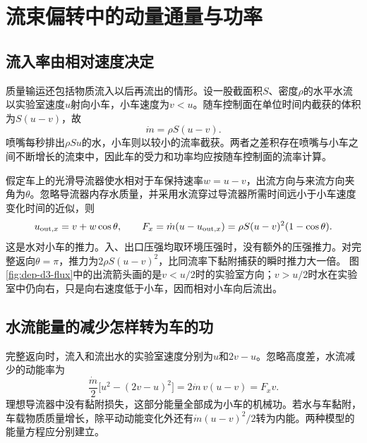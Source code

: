 \section{流束偏转中的动量通量与功率}
\subsection{流入率由相对速度决定}
质量输运还包括物质流入以后再流出的情形。设一股截面积$S$、密度$\rho$的水平水流以实验室速度$u$射向小车，小车速度为$v<u$。随车控制面在单位时间内截获的体积为$S(u-v)$，故
\[
 \dot m=\rho S(u-v).
\]
喷嘴每秒排出$\rho Su$的水，小车则以较小的流率截获。两者之差积存在喷嘴与小车之间不断增长的流束中，因此车的受力和功率均应按随车控制面的流率计算。

假定车上的光滑导流器使水相对于车保持速率$w=u-v$，出流方向与来流方向夹角为$\theta$。忽略导流器内存水质量，并采用水流穿过导流器所需时间远小于小车速度变化时间的近似，则
\[
 u_{{\rm out},x}=v+w\cos\theta,\qquad
 F_x=\dot m(u-u_{{\rm out},x})
 =\rho S(u-v)^2(1-\cos\theta).
\]
这是水对小车的推力。入、出口压强均取环境压强时，没有额外的压强推力。对完整返向$\theta=\pi$，推力为$2\rho S(u-v)^2$，比同流率下黏附捕获的瞬时推力大一倍。
图\ref{fig:dep-d3-flux}中的出流箭头画的是$v<u/2$时的实验室方向；$v>u/2$时水在实验室中仍向右，只是向右速度低于小车，因而相对小车向后流出。

\subsection{水流能量的减少怎样转为车的功}
完整返向时，流入和流出水的实验室速度分别为$u$和$2v-u$。忽略高度差，水流减少的动能率为
\[
 \frac{\dot m}{2}\bigl[u^2-(2v-u)^2\bigr]
 =2\dot m\,v(u-v)=F_xv.
\]
理想导流器中没有黏附损失，这部分能量全部成为小车的机械功。若水与车黏附，车载物质质量增长，除平动动能变化外还有$\dot m(u-v)^2/2$转为内能。两种模型的能量方程应分别建立。

